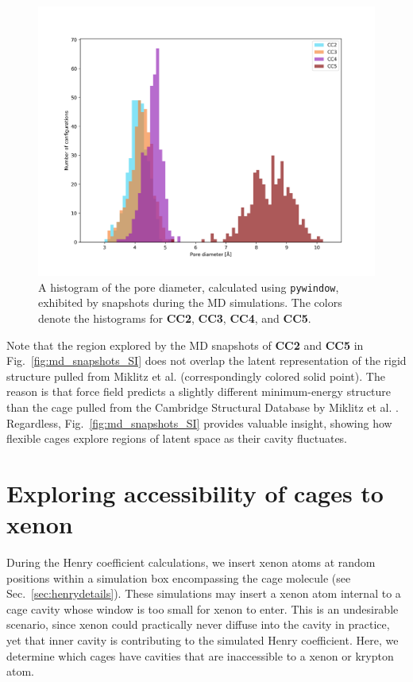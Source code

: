 \documentclass[journal=jacsat,manuscript=article]{achemso}
\begin{document}
\begin{figure}
\centering
	\includegraphics[width=0.65\columnwidth]{../pore_diameter_histogram.png}
	\caption{A histogram of the pore diameter, calculated using \texttt{pywindow}, exhibited by snapshots during the MD simulations. The colors denote the histograms for \textbf{CC2}, \textbf{CC3}, \textbf{CC4}, and \textbf{CC5}.
	} \label{fig:pore_diameter_histogram}
\end{figure}

Note that the region explored by the MD snapshots of \textbf{CC2} and \textbf{CC5} in Fig.~\ref{fig:md_snapshots_SI} does not overlap the latent representation of the rigid structure pulled from Miklitz et al. \cite{miklitz2017computational} (correspondingly colored solid point). The reason is that force field predicts a slightly different minimum-energy structure than the cage pulled from the Cambridge Structural Database by Miklitz et al. \cite{miklitz2017computational}. Regardless, Fig.~\ref{fig:md_snapshots_SI} provides valuable insight, showing how flexible cages explore regions of latent space as their cavity fluctuates.

\clearpage

\section{Exploring accessibility of cages to xenon}
\label{sec:inaccessibility}

During the Henry coefficient calculations, we insert xenon atoms at random positions within a simulation box encompassing the cage molecule (see Sec.~\ref{sec:henrydetails}). These simulations may insert a xenon atom internal to a cage cavity whose window is too small for xenon to enter. This is an undesirable scenario, since xenon could practically never diffuse into the cavity in practice, yet that inner cavity is contributing to the simulated Henry coefficient. Here, we determine which cages have cavities that are inaccessible to a xenon or krypton atom.
\end{document}
